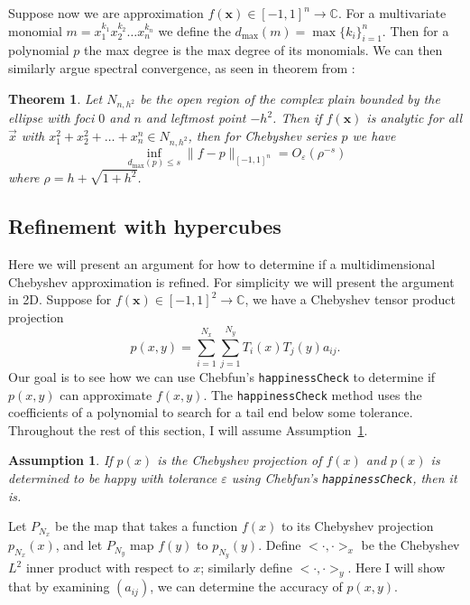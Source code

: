 \documentclass{article}
\newtheorem{theorem}{Theorem}[section]
\newtheorem{assumption}{Assumption}
\newcommand{\C}{\mathbb{C}}
\newcommand{\vect}[1]{\mathbf{#1}}
\newcommand{\dm}{d_{\text{max}}}
\begin{document}
Suppose now we are approximation $f(\vect{x}) \in [-1,1]^n \to \C$. For a multivariate monomial $m = x_1^{k_1} x_2^{k_2} \dots x_n^{k_n}$ we define the $\dm(m) = \max\{ k_ i\}_{i=1}^n$. Then for a polynomial $p$ the max degree is the max degree of its monomials. We can then similarly argue spectral convergence, as seen in theorem from \cite{2016arXiv160802216T}:
\begin{theorem} Let $N_{n,h^2}$ be the open region of the complex plain bounded by the ellipse with foci $0$ and $n$ and leftmost point $-h^2$. Then if $f(\vect{x})$ is analytic for all $\vec{x}$ with $x_1^2+x_2^2+\dots+x_n^n \in N_{n,h^2}$, then for Chebyshev series $p$ we have
$$
\inf_{\dm(p) \leq s} \|f - p\|_{[-1,1]^n}= O_{\varepsilon}(\rho^{-s})
$$
where $\rho = h + \sqrt{1+h^2}$.
\end{theorem}

\subsection{Refinement with hypercubes}
Here we will present an argument for how to determine if a multidimensional Chebyshev approximation is refined. For simplicity we will present the argument in 2D. Suppose for $f(\vect{x}) \in [-1,1]^2 \to \C$, we have a Chebyshev tensor product projection
\begin{equation}
p(x,y) = \sum_{i=1}^{N_x} \sum_{j=1}^{N_y} T_i(x) T_j(y) a_{ij}.	
\end{equation}
Our goal is to see how we can use Chebfun's {\tt happinessCheck} to determine if $p(x,y)$ can approximate $f(x,y)$. The {\tt happinessCheck} method uses the coefficients of a polynomial to search for a tail end below some tolerance. Throughout the rest of this section, I will assume Assumption~\ref{happy_as}.
\begin{assumption}
\label{happy_as}
If $p(x)$ is the Chebyshev projection of $f(x)$ and $p(x)$ is determined to be happy with tolerance $\varepsilon$ using  Chebfun's {\tt happinessCheck}, then it is. 
\end{assumption}

Let $P_{N_x}$ be the map that takes a function $f(x)$ to its Chebyshev projection $p_{N_x}(x)$, and let $P_{N_y}$ map $f(y)$ to $p_{N_y}(y)$. Define $<\cdot,\cdot>_{x}$ be the Chebyshev $L^2$ inner product with respect to $x$; similarly define $<\cdot,\cdot>_{y}$. Here I will show that by examining $(a_{ij})$, we can determine the accuracy of $p(x,y)$.
\end{document}
